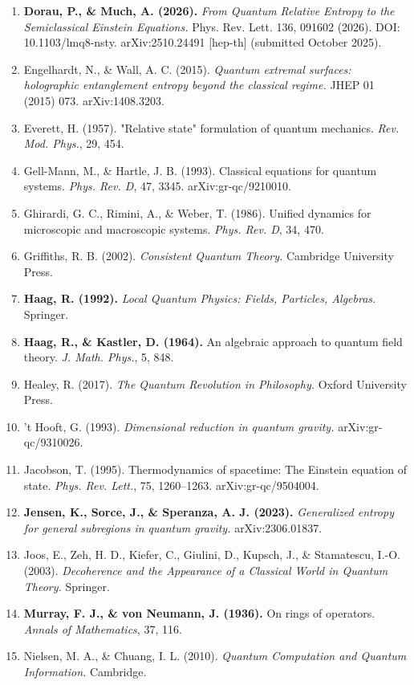 \documentclass[11pt,a4paper]{article}
\begin{document}
\begin{enumerate}
  \item \textbf{Dorau, P., \& Much, A. (2026).} \emph{From Quantum Relative Entropy to the Semiclassical Einstein Equations.} Phys. Rev. Lett. 136, 091602 (2026). DOI: 10.1103/lmq8-nsty. arXiv:2510.24491 [hep-th] (submitted October 2025).
  \item Engelhardt, N., \& Wall, A. C. (2015). \emph{Quantum extremal surfaces: holographic entanglement entropy beyond the classical regime.} JHEP 01 (2015) 073. arXiv:1408.3203.
  \item Everett, H. (1957). "Relative state" formulation of quantum mechanics. \emph{Rev. Mod. Phys.}, 29, 454.
  \item Gell-Mann, M., \& Hartle, J. B. (1993). Classical equations for quantum systems. \emph{Phys. Rev. D}, 47, 3345. arXiv:gr-qc/9210010.
  \item Ghirardi, G. C., Rimini, A., \& Weber, T. (1986). Unified dynamics for microscopic and macroscopic systems. \emph{Phys. Rev. D}, 34, 470.
  \item Griffiths, R. B. (2002). \emph{Consistent Quantum Theory.} Cambridge University Press.
  \item \textbf{Haag, R. (1992).} \emph{Local Quantum Physics: Fields, Particles, Algebras.} Springer.
  \item \textbf{Haag, R., \& Kastler, D. (1964).} An algebraic approach to quantum field theory. \emph{J. Math. Phys.}, 5, 848.
  \item Healey, R. (2017). \emph{The Quantum Revolution in Philosophy.} Oxford University Press.
  \item 't Hooft, G. (1993). \emph{Dimensional reduction in quantum gravity.} arXiv:gr-qc/9310026.
  \item Jacobson, T. (1995). Thermodynamics of spacetime: The Einstein equation of state. \emph{Phys. Rev. Lett.}, 75, 1260–1263. arXiv:gr-qc/9504004.
  \item \textbf{Jensen, K., Sorce, J., \& Speranza, A. J. (2023).} \emph{Generalized entropy for general subregions in quantum gravity.} arXiv:2306.01837.
  \item Joos, E., Zeh, H. D., Kiefer, C., Giulini, D., Kupsch, J., \& Stamatescu, I.-O. (2003). \emph{Decoherence and the Appearance of a Classical World in Quantum Theory.} Springer.
  \item \textbf{Murray, F. J., \& von Neumann, J. (1936).} On rings of operators. \emph{Annals of Mathematics}, 37, 116.
  \item Nielsen, M. A., \& Chuang, I. L. (2010). \emph{Quantum Computation and Quantum Information.} Cambridge.

\end{enumerate}
\end{document}
